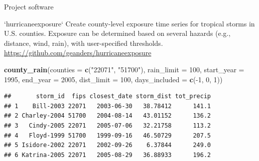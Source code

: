 \documentclass[ignorenonframetext,]{beamer}
\newenvironment{Shaded}{\begin{snugshade}}{\end{snugshade}}
\newcommand{\KeywordTok}[1]{\textcolor[rgb]{0.13,0.29,0.53}{\textbf{{#1}}}}
\newcommand{\DataTypeTok}[1]{\textcolor[rgb]{0.13,0.29,0.53}{{#1}}}
\newcommand{\DecValTok}[1]{\textcolor[rgb]{0.00,0.00,0.81}{{#1}}}
\newcommand{\StringTok}[1]{\textcolor[rgb]{0.31,0.60,0.02}{{#1}}}
\newcommand{\NormalTok}[1]{{#1}}
\begin{document}
\begin{frame}[fragile]{Project software}

\footnotesize

\begin{block}{`hurricaneexposure`}
Create county-level exposure time series for tropical storms in U.S. counties. Exposure can be determined based on several hazards (e.g., distance, wind, rain), with user-specified thresholds. 
\url{https://github.com/geanders/hurricaneexposure}
\end{block}

\begin{Shaded}
\begin{Highlighting}[]
\KeywordTok{county_rain}\NormalTok{(}\DataTypeTok{counties =} \KeywordTok{c}\NormalTok{(}\StringTok{"22071"}\NormalTok{, }\StringTok{"51700"}\NormalTok{), }\DataTypeTok{rain_limit =} \DecValTok{100}\NormalTok{, }
            \DataTypeTok{start_year =} \DecValTok{1995}\NormalTok{, }\DataTypeTok{end_year =} \DecValTok{2005}\NormalTok{, }\DataTypeTok{dist_limit =} \DecValTok{100}\NormalTok{,}
            \DataTypeTok{days_included =} \KeywordTok{c}\NormalTok{(-}\DecValTok{1}\NormalTok{, }\DecValTok{0}\NormalTok{, }\DecValTok{1}\NormalTok{))}
\end{Highlighting}
\end{Shaded}

\begin{verbatim}
##       storm_id  fips closest_date storm_dist tot_precip
## 1    Bill-2003 22071   2003-06-30   38.78412      141.1
## 2 Charley-2004 51700   2004-08-14   43.01152      136.2
## 3   Cindy-2005 22071   2005-07-06   32.21758      113.2
## 4   Floyd-1999 51700   1999-09-16   46.50729      207.5
## 5 Isidore-2002 22071   2002-09-26    6.37844      249.0
## 6 Katrina-2005 22071   2005-08-29   36.88933      196.2
\end{verbatim}

\end{frame}
\end{document}
